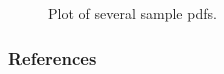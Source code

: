 \documentclass[11pt, aspectratio=169]{beamer}
\begin{document}
\begin{frame}[plain]
    \begin{figure}
        \centering
        \resizebox{0.9\textwidth}{0.9\textheight}{}
        \caption[Several sampled pdfs]{Plot of several sample pdfs.}
        \label{fig:some_densities}
    \end{figure}
\end{frame}


\begin{frame}[allowframebreaks]
    \frametitle{References}
    \renewcommand{\bibfont}{\normalfont\footnotesize}
    \printbibliography
\end{frame}
\end{document}
